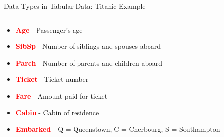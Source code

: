 \documentclass[8pt,aspectratio=1610]{beamer}
\begin{document}
\begin{frame}{Data Types in Tabular Data: Titanic Example}
\begin{columns}
\begin{column}{0.48\textwidth}
\begin{itemize}
\setlength{\itemsep}{2pt}
\item \textcolor{red}{\textbf{Age}} - Passenger's age
\item \textcolor{red}{\textbf{SibSp}} - Number of siblings and spouses aboard
\item \textcolor{red}{\textbf{Parch}} - Number of parents and children aboard
\item \textcolor{red}{\textbf{Ticket}} - Ticket number
\item \textcolor{red}{\textbf{Fare}} - Amount paid for ticket
\item \textcolor{red}{\textbf{Cabin}} - Cabin of residence
\item \textcolor{red}{\textbf{Embarked}} - Q = Queenstown, C = Cherbourg, S = Southampton
\end{itemize}
\end{column}
\end{columns}
\end{frame}
\end{document}
